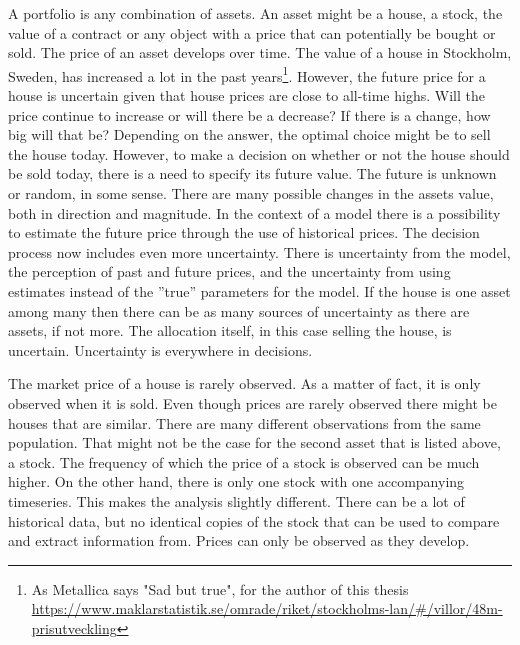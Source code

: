 A portfolio is any combination of assets.
An asset might be a house, a stock, the value of a contract or any object with a price that can potentially be bought or sold.
The price of an asset develops over time.
The value of a house in Stockholm, Sweden, has increased a lot in the past years\footnote{As Metallica says "Sad but true", for the author of this thesis \url{https://www.maklarstatistik.se/omrade/riket/stockholms-lan/\#/villor/48m-prisutveckling}}.
However, the future price for a house is uncertain given that house prices are close to all-time highs.
Will the price continue to increase or will there be a decrease?
If there is a change, how big will that be?
Depending on the answer, the optimal choice might be to sell the house today.
However, to make a decision on whether or not the house should be sold today, there is a need to specify its future value. 
The future is unknown or random, in some sense.
There are many possible changes in the assets value, both in direction and magnitude.
In the context of a model there is a possibility to estimate the future price through the use of historical prices.
The decision process now includes even more uncertainty.
There is uncertainty from the model, the perception of past and future prices, and the uncertainty from using estimates instead of the ''true'' parameters for the model.
If the house is one asset among many then there can be as many sources of uncertainty as there are assets, if not more.
The allocation itself, in this case selling the house, is uncertain.
Uncertainty is everywhere in decisions.

The market price of a house is rarely observed.
As a matter of fact, it is only observed when it is sold.
Even though prices are rarely observed there might be houses that are similar.
There are many different observations from the same population. 
That might not be the case for the second asset that is listed above, a stock.
The frequency of which the price of a stock is observed can be much higher.
On the other hand, there is only one stock with one accompanying timeseries.
This makes the analysis slightly different.
There can be a lot of historical data, but no identical copies of the stock that can be used to compare and extract information from.
Prices can only be observed as they develop.

